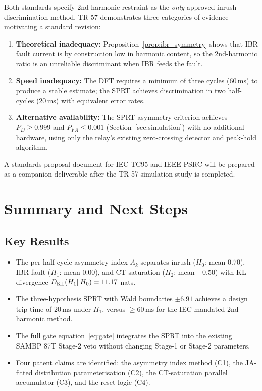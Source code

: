 \documentclass[11pt, a4paper]{article}
\newcommand{\Ak}{A_k}
\newcommand{\ms}{\,\text{ms}}
\begin{document}
Both standards specify 2nd-harmonic restraint as the \emph{only} approved
inrush discrimination method.  TR-57 demonstrates three categories of evidence
motivating a standard revision:

\begin{enumerate}
  \item \textbf{Theoretical inadequacy:} Proposition~\ref{prop:ibr_symmetry}
    shows that IBR fault current is by construction low in harmonic content,
    so the 2nd-harmonic ratio is an unreliable discriminant when IBR feeds
    the fault.

  \item \textbf{Speed inadequacy:} The DFT requires a minimum of three cycles
    (60\,ms) to produce a stable estimate; the SPRT achieves discrimination
    in two half-cycles (20\,ms) with equivalent error rates.

  \item \textbf{Alternative availability:} The SPRT asymmetry criterion achieves
    $P_D \geq 0.999$ and $P_{FA} \leq 0.001$ (Section~\ref{sec:simulation})
    with no additional hardware, using only the relay's existing zero-crossing
    detector and peak-hold algorithm.
\end{enumerate}

A standards proposal document for IEC TC95 and IEEE PSRC will be prepared
as a companion deliverable after the TR-57 simulation study is completed.

\section{Summary and Next Steps}
\label{sec:summary}

\subsection{Key Results}

\begin{itemize}
  \item The per-half-cycle asymmetry index $\Ak$ separates inrush ($H_0$: mean
    $0.70$), IBR fault ($H_1$: mean $0.00$), and CT saturation ($H_2$: mean
    $-0.50$) with KL divergence $D_{\rm KL}(H_1\|H_0) = 11.17$ nats.
  \item The three-hypothesis SPRT with Wald boundaries $\pm 6.91$ achieves
    a design trip time of $20\ms$ under $H_1$, versus $\geq 60\ms$ for the
    IEC-mandated 2nd-harmonic method.
  \item The full gate equation~\eqref{eq:gate} integrates the SPRT into the
    existing SAMBP 87T Stage-2 veto without changing Stage-1 or Stage-2
    parameters.
  \item Four patent claims are identified: the asymmetry index method (C1),
    the JA-fitted distribution parameterisation (C2), the CT-saturation
    parallel accumulator (C3), and the reset logic (C4).
\end{itemize}
\end{document}
